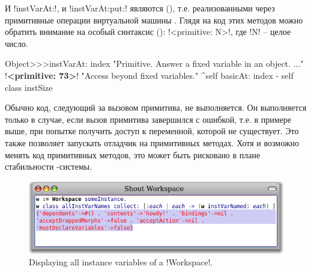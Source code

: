 \documentclass[a4paper,10pt,twoside]{book}
\begin{document}
И \ct!instVarAt:!, и \ct!instVarAt:put:! являются  (), т.е. реализованными через примитивные операции виртуальной машины \pharo.
Глядя на код этих методов можно обратить внимание на особый синтаксис  (): \ct!<primitive: N>!, где \ct!N! -- целое число.

\begin{code}{}
Object>>>instVarAt: index 
	"Primitive. Answer a fixed variable in an object. ..."
	!\textbf{<primitive: 73>}!
	"Access beyond fixed variables."
	^self basicAt: index - self class instSize		
\end{code}

Обычно код, следующий за вызовом примитива, не выполняется.
Он выполняется только в случае, если вызов примитива завершился с ошибкой, т.е. в примере выше, при попытке получить доступ к переменной, которой не существует.
Это также позволяет запускать отладчик на примитивных методах.
Хотя и возможно менять код примитивных методов, это может быть рисковано в плане стабильности \pharo-системы.

\begin{figure}[ht]\centering
	\includegraphics[width=\linewidth]{allInstanceVariables}
	\caption{Displaying all instance variables of a \ct!Workspace!.}
\end{figure}
\end{document}

